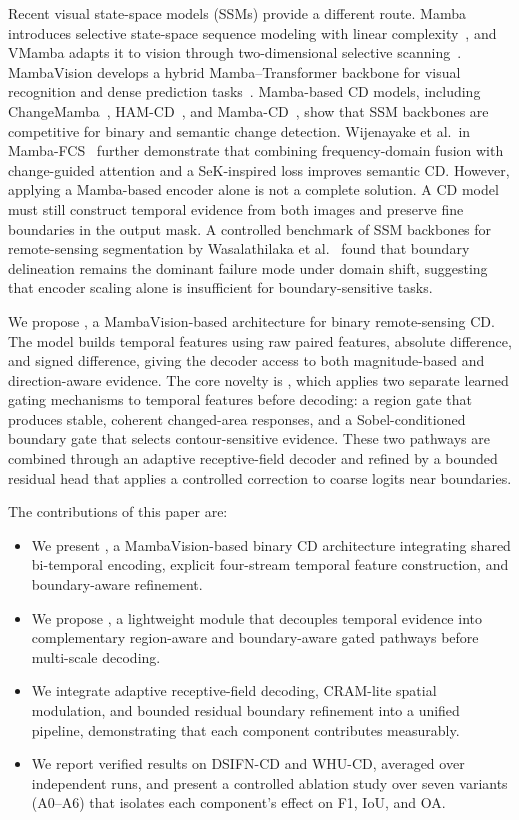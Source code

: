 Recent visual state-space models (SSMs) provide a different route. Mamba introduces selective state-space sequence modeling with linear complexity~\cite{gu2023mamba}, and VMamba adapts it to vision through two-dimensional selective scanning~\cite{liu2024vmamba}. MambaVision develops a hybrid Mamba--Transformer backbone for visual recognition and dense prediction tasks~\cite{hatamizadeh2025mambavision}. Mamba-based CD models, including ChangeMamba~\cite{chen2024changemamba}, HAM-CD~\cite{li2026hamcd}, and Mamba-CD~\cite{peng2026mambacd}, show that SSM backbones are competitive for binary and semantic change detection. Wijenayake et al.\ in Mamba-FCS~\cite{mambafcs} further demonstrate that combining frequency-domain fusion with change-guided attention and a SeK-inspired loss improves semantic CD. However, applying a Mamba-based encoder alone is not a complete solution. A CD model must still construct temporal evidence from both images and preserve fine boundaries in the output mask. A controlled benchmark of SSM backbones for remote-sensing segmentation by Wasalathilaka et al.~\cite{wasalathilaka2026controlled} found that boundary delineation remains the dominant failure mode under domain shift, suggesting that encoder scaling alone is insufficient for boundary-sensitive tasks.

We propose \textbf{\ours}, a MambaVision-based architecture for binary remote-sensing CD. The model builds temporal features using raw paired features, absolute difference, and signed difference, giving the decoder access to both magnitude-based and direction-aware evidence. The core novelty is \textbf{\drbi}, which applies two separate learned gating mechanisms to temporal features before decoding: a region gate that produces stable, coherent changed-area responses, and a Sobel-conditioned boundary gate that selects contour-sensitive evidence. These two pathways are combined through an adaptive receptive-field decoder and refined by a bounded residual head that applies a controlled correction to coarse logits near boundaries.

The contributions of this paper are:
\begin{itemize}
    \item We present \textbf{\ours}, a MambaVision-based binary CD architecture integrating shared bi-temporal encoding, explicit four-stream temporal feature construction, and boundary-aware refinement.
    \item We propose \textbf{\drbi}, a lightweight module that decouples temporal evidence into complementary region-aware and boundary-aware gated pathways before multi-scale decoding.
    \item We integrate adaptive receptive-field decoding, CRAM-lite spatial modulation, and bounded residual boundary refinement into a unified pipeline, demonstrating that each component contributes measurably.
    \item We report verified results on DSIFN-CD and WHU-CD, averaged over independent runs, and present a controlled ablation study over seven variants (A0--A6) that isolates each component's effect on F1, IoU, and OA.
\end{itemize}
